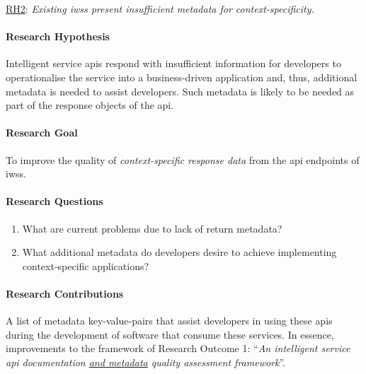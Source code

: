 \begin{titled-frame}{\underline{RH2}: \textit{Existing \glspl{iws} present insufficient metadata for context-specificity.} }
\label{rh2}
\vspace{-12pt}
\paragraph{Research Hypothesis}
Intelligent service \glspl{api} respond with insufficient information for developers to operationalise the service into a business-driven application and, thus, additional metadata is needed to assist developers. Such metadata is likely to be needed as part of the response objects of the \gls{api}.

\paragraph{Research Goal}
To improve the quality of \textit{context-specific response data} from the \gls{api} endpoints of \glspl{iws}.

\paragraph{Research Questions}
\begin{enumerate}[label=\textbf{RQ2.\arabic*.}, ref=RQ2.\arabic*, leftmargin=3.5\parindent, rightmargin=1\parindent]
  \item What are current problems due to lack of return metadata?
  \label{rqs:metadata:what-problems-du                                                                e-to-lack-of-metadata}
  
  
  \item What additional metadata do developers desire to achieve implementing context-specific applications?
  \label{rqs:metadata:what-metadata-do-devs-want-and-why}
\end{enumerate}

\paragraph{Research Contributions} A list of metadata key-value-pairs that assist developers in using these \glspl{api} during the development of software that consume these services. In essence, improvements to the framework of Research Outcome 1: ``\textit{An intelligent service \gls{api} documentation \underline{\upshape and metadata} quality assessment framework}''.

\end{titled-frame}

